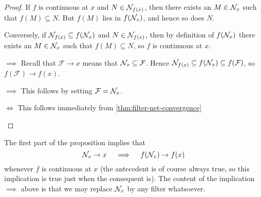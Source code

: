 \documentclass[article, a4paper, 11pt, oneside]{memoir}
\numberwithin{equation}{chapter}
\newcommand{\calF}{\mathcal{F}}
\theoremstyle{nonumberplain}
\begin{document}
\begin{proof}
    If $f$ is continuous at $x$ and $N \in \mathcal{N}_{f(x)}$, then there exists an $M \in \mathcal{N}_{x}$ such that $f(M) \subseteq N$. But $f(M)$ lies in $f(\mathcal{N}_{x})$, and hence so does $N$.

    Conversely, if $\mathcal{N}_{f(x)} \subseteq f(\mathcal{N}_{x})$ and $N \in \mathcal{N}_{f(x)}$, then by definition of $f(\mathcal{N}_{x})$ there exists an $M \in \mathcal{N}_{x}$ such that $f(M) \subseteq N$, so $f$ is continuous at $x$.
%
\begin{proofsec}
    
    \item[\subcref{enum:continuity-point} $\implies$ \subcref{enum:filter-convergence-point}]
    Recall that $\calF \to x$ means that $\nhoods{x} \subseteq \calF$. Hence $\nhoods{f(x)} \subseteq f(\nhoods{x}) \subseteq f(\calF)$, so $f(\calF) \to f(x)$.

    \item[\subcref{enum:filter-convergence-point} $\implies$ \subcref{enum:continuity-point}]
    This follows by setting $\calF = \nhoods{x}$.

    \item[\subcref{enum:filter-convergence-point} $\Leftrightarrow$ \subcref{enum:net-convergence-point}]
    This follows immediately from \cref{thm:filter-net-convergence}
\end{proofsec}
\end{proof}
%
The first part of the proposition implies that
%
\begin{equation*}
    \mathcal{N}_{x} \to x
    \quad \implies \quad
    f(\mathcal{N}_{x}) \to f(x)
\end{equation*}
%
whenever $f$ is continuous at $x$ (the antecedent is of course always true, so this implication is true just when the consequent is). The content of the implication  $\implies$  above is that we may replace $\mathcal{N}_{x}$ by any filter whatsoever.
\end{document}

